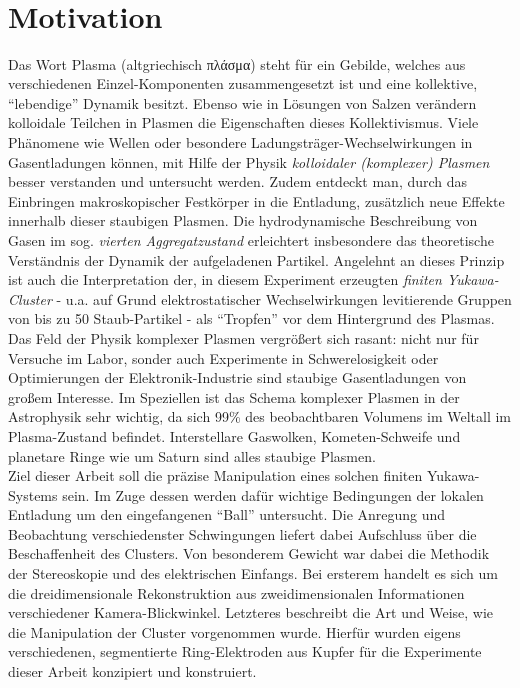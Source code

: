 \documentclass[numbers=noenddot,a4paper,notitlepage,twoside,BCOR15mm]{scrbook}
\newcommand{\greek}[1]{\greektext#1\latintext}
\newcommand{\tilt}[1]{\textit{#1}}
\begin{document}
	\thispagestyle{empty}

	\newpage
	\thispagestyle{empty}
	\begin{align*}
	\,
	\end{align*}
	\newpage

	\tableofcontents

	\newpage

	\chapter{Motivation}\label{sec:einleitung}

		Das Wort Plasma (altgriechisch  \greek{πλάσμα}) steht für ein Gebilde, welches aus verschiedenen Einzel-Komponenten zusammengesetzt ist und eine kollektive, "`lebendige"' Dynamik besitzt. Ebenso wie in Lösungen von Salzen verändern kolloidale Teilchen in Plasmen die Eigenschaften dieses Kollektivismus. Viele Phänomene wie Wellen oder besondere Ladungsträger-Wechselwirkungen in Gasentladungen können, mit Hilfe der Physik \tilt{kolloidaler (komplexer) Plasmen} besser verstanden und untersucht werden. Zudem entdeckt man, durch das Einbringen makroskopischer Festkörper in die Entladung, zusätzlich neue Effekte innerhalb dieser staubigen Plasmen. Die hydrodynamische Beschreibung von Gasen im sog. \tilt{vierten Aggregatzustand} erleichtert insbesondere das theoretische Verständnis der Dynamik der aufgeladenen Partikel. Angelehnt an dieses Prinzip ist auch die Interpretation der, in diesem Experiment erzeugten \tilt{finiten Yukawa-Cluster} - u.a. auf Grund elektrostatischer Wechselwirkungen levitierende Gruppen von bis zu 50 Staub-Partikel - als "`Tropfen"' vor dem Hintergrund des Plasmas.\\
		Das Feld der Physik komplexer Plasmen vergrößert sich rasant: nicht nur für Versuche im Labor, sonder auch Experimente in Schwerelosigkeit oder Optimierungen der Elektronik-Industrie sind staubige Gasentladungen von großem Interesse. Im Speziellen ist das Schema komplexer Plasmen in der Astrophysik sehr wichtig, da sich 99\% des beobachtbaren Volumens im Weltall im Plasma-Zustand befindet. Interstellare Gaswolken, Kometen-Schweife und planetare Ringe wie um Saturn sind alles staubige Plasmen.\\
		Ziel dieser Arbeit soll die präzise Manipulation eines solchen finiten Yukawa-Systems sein. Im Zuge dessen werden dafür wichtige Bedingungen der lokalen Entladung um den eingefangenen "`Ball"' untersucht. Die Anregung und Beobachtung verschiedenster Schwingungen liefert dabei Aufschluss über die Beschaffenheit des Clusters. Von besonderem Gewicht war dabei die Methodik der Stereoskopie und des elektrischen Einfangs. Bei ersterem handelt es sich um die dreidimensionale Rekonstruktion aus zweidimensionalen Informationen verschiedener Kamera-Blickwinkel. Letzteres beschreibt die Art und Weise, wie die Manipulation der Cluster vorgenommen wurde. Hierfür wurden eigens verschiedenen, segmentierte Ring-Elektroden aus Kupfer für die Experimente dieser Arbeit konzipiert und konstruiert.\newline
\end{document}
